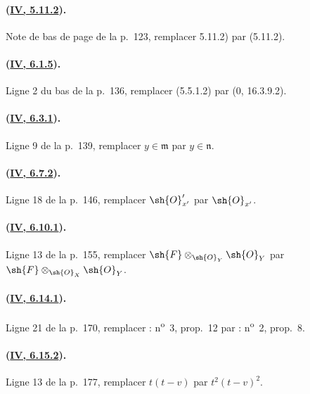 \paragraph{({\texorpdfstring{\protect\hyperref[canon-index.ega4.c04.cor.5-11-2]{IV, 5.11.2}}{IV, 5.11.2}}).}
Note de bas de page de la p.~123, remplacer 5.11.2) par (5.11.2).

\paragraph{({\texorpdfstring{\protect\hyperref[canon-index.ega4.c04.prop.6-1-5]{IV, 6.1.5}}{IV, 6.1.5}}).}
Ligne 2 du bas de la p.~136, remplacer (5.5.1.2) par
($0$, 16.3.9.2).

\paragraph{({\texorpdfstring{\protect\hyperref[canon-index.ega4.c04.prop.6-3-1]{IV, 6.3.1}}{IV, 6.3.1}}).}
Ligne 9 de la p.~139, remplacer $y\in\mathfrak m$ par
$y\in\mathfrak n$.

\paragraph{({\texorpdfstring{\protect\hyperref[canon-index.ega4.c04.cor.6-7-2]{IV, 6.7.2}}{IV, 6.7.2}}).}
Ligne 18 de la p.~146, remplacer $\sh{O}'_{x'}$ par $\sh{O}_{x'}$.

\paragraph{({\texorpdfstring{\protect\hyperref[canon-index.ega4.c04.statement.6-10-1]{IV, 6.10.1}}{IV, 6.10.1}}).}
Ligne 13 de la p.~155, remplacer
$\sh{F}\otimes_{\sh{O}_Y}\sh{O}_Y$ par
$\sh{F}\otimes_{\sh{O}_X}\sh{O}_Y$.

\paragraph{({\texorpdfstring{\protect\hyperref[canon-index.ega4.c04.prop.6-14-1]{IV, 6.14.1}}{IV, 6.14.1}}).}
Ligne 21 de la p.~170, remplacer : n\textsuperscript{o}~3, prop.~12
par : n\textsuperscript{o}~2, prop.~8.

\paragraph{({\texorpdfstring{\protect\hyperref[canon-index.ega4.c04.statement.6-15-2]{IV, 6.15.2}}{IV, 6.15.2}}).}
Ligne 13 de la p.~177, remplacer $t(t-v)$ par $t^2(t-v)^2$.

